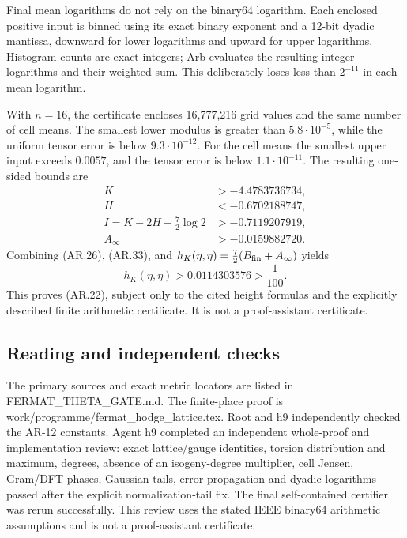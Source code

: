 \documentclass[11pt,a4paper]{article}
\begin{document}
Final mean logarithms do not rely on the binary64 logarithm. Each
enclosed positive input is binned using its exact binary exponent and a
12-bit dyadic mantissa, downward for lower logarithms and upward for
upper logarithms. Histogram counts are exact integers; Arb evaluates the
resulting integer logarithms and their weighted sum. This deliberately
loses less than \(2^{-11}\) in each mean logarithm.

With \(n=16\), the certificate encloses 16,777,216 grid values and the
same number of cell means. The smallest lower modulus is greater than
\(5.8\cdot10^{-5}\), while the uniform tensor error is below
\(9.3\cdot10^{-12}\). For the cell means the smallest upper input
exceeds \(0.0057\), and the tensor error is below \(1.1\cdot10^{-11}\).
The resulting one-sided bounds are \[
\begin{aligned}
K&>-4.4783736734,\\
H&<-0.6702188747,\\
I=K-2H+\tfrac72\log2&>-0.7119207919,\\
A_\infty&>-0.0159882720.
\end{aligned}
\tag{AR.33}
\] Combining (AR.26), (AR.33), and
\(h_K(\eta,\eta)=\frac72(B_{\rm fin}+A_\infty)\) yields \[
h_K(\eta,\eta)>0.0114303576>\frac1{100}.
\] This proves (AR.22), subject only to the cited height formulas and
the explicitly described finite arithmetic certificate. It is not a
proof-assistant certificate.

\subsection{Reading and independent
checks}\label{reading-and-independent-checks}

The primary sources and exact metric locators are listed in
FERMAT\_THETA\_GATE.md. The finite-place proof is
work/programme/fermat\_hodge\_lattice.tex. Root and h9 independently
checked the AR-12 constants. Agent h9 completed an independent
whole-proof and implementation review: exact lattice/gauge identities,
torsion distribution and maximum, degrees, absence of an isogeny-degree
multiplier, cell Jensen, Gram/DFT phases, Gaussian tails, error
propagation and dyadic logarithms passed after the explicit
normalization-tail fix. The final self-contained certifier was rerun
successfully. This review uses the stated IEEE binary64 arithmetic
assumptions and is not a proof-assistant certificate.
\end{document}
